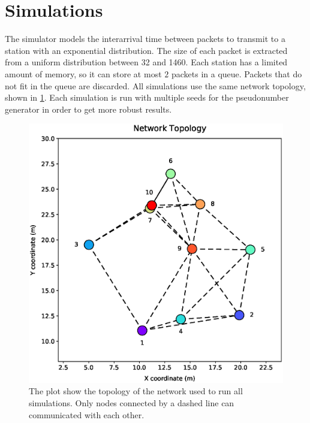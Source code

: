 \section{Simulations}
\label{sec:simulation}

The simulator models the interarrival time between packets to transmit to a station with an exponential distribution.
The size of each packet is extracted from a uniform distribution between \num{32} and \SI{1460}{\byte}.
Each station has a limited amount of memory, so it can store at most $2$ packets in a queue.
Packets that do not fit in the queue are discarded.
All simulations use the same network topology, shown in \cref{fig:network}.
Each simulation is run with multiple seeds for the pseudonumber generator in order to get more robust results.

\begin{figure}[ht]
	\centering
	\includegraphics[width=0.9\columnwidth]{figures/plots/topology}
	\caption{The plot show the topology of the network used to run all simulations. Only nodes connected by a dashed line can communicated with each other.}
	\label{fig:network}
\end{figure}

